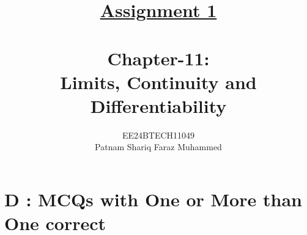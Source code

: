 \documentclass[journal,12pt,twocolumn]{IEEEtran}
\theoremstyle{remark}
\begin{document}


\title{{\uline{Assignment 1 \\ } \\}Chapter-11: \\Limits, Continuity and Differentiability}
\author{{EE24BTECH11049 \\ Patnam Shariq Faraz Muhammed}}


 
\maketitle
\newpage
\bigskip

\renewcommand{\thefigure}{\theenumi}
\renewcommand{\thetable}{\theenumi}

\section*{D : MCQs with One or More than One correct}
\end{document}
